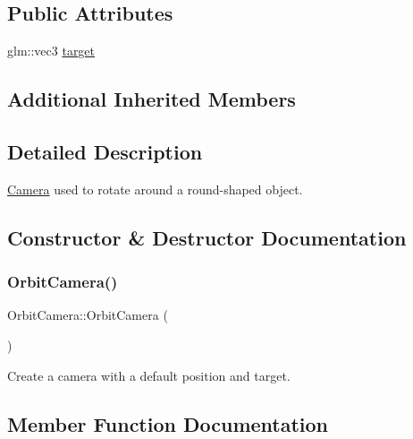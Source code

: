 \subsection*{Public Attributes}
\begin{DoxyCompactItemize}
\item 
glm\+::vec3 \hyperlink{classOrbitCamera_ab6f07eef6c4b0226b7abfc537b698c89}{target}
\end{DoxyCompactItemize}
\subsection*{Additional Inherited Members}


\subsection{Detailed Description}
\hyperlink{classCamera}{Camera} used to rotate around a round-\/shaped object. 

\subsection{Constructor \& Destructor Documentation}
\mbox{\label{classOrbitCamera_ae87a8ab83042c47dac97a41ab4eb9e8c}} 
\subsubsection{\texorpdfstring{Orbit\+Camera()}{OrbitCamera()}}
{\footnotesize\ttfamily Orbit\+Camera\+::\+Orbit\+Camera (\begin{DoxyParamCaption}{ }\end{DoxyParamCaption})}



Create a camera with a default position and target. 



\subsection{Member Function Documentation}
\mbox{\label{classOrbitCamera_af8cb999454725d091971106c4a7bf715}} 
